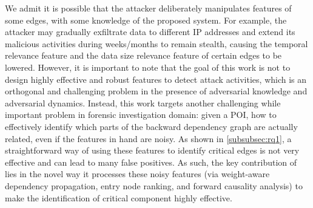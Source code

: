 


We admit it is possible that the attacker deliberately manipulates features of some edges, with some knowledge of the
proposed system.
For example, the attacker may gradually exfiltrate data to different IP addresses and extend its malicious activities during weeks/months to remain stealth, causing the temporal relevance feature and the data size relevance feature of certain edges to be lowered.
%
However, it is important to note that the goal of this work is not to design highly effective and robust features to detect attack activities, which is an orthogonal and challenging problem in the presence of adversarial knowledge and adversarial dynamics. 
Instead, this work targets another challenging while important problem in forensic investigation domain: given a POI, how to effectively identify which parts of the backward dependency graph are actually related, even if the features in hand are noisy.
As shown in \cref{subsubsec:rq1}, a straightforward way of using these features to identify critical edges is not very effective and can lead to many false positives.
As such, the key contribution of \tool lies in the novel way it processes these noisy features (\ie via weight-aware dependency propagation, entry node ranking, and forward causality analysis) to make the identification of critical component highly effective. 



